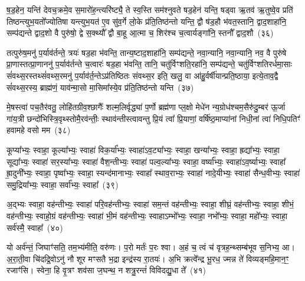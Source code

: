 ष॒ड॒हेन॒ यन्ति॑ देवच॒क्रमे॒व स॒मारो॑ह॒न्त्यरि॑ष्ट्यै॒ ते स्व॒स्ति सम॑श्नुवते षड॒हेन॑ यन्ति॒ षड्वा ऋ॒तव॑ ऋ॒तुष्वे॒व प्रति॑ तिष्ठन्त्युभ॒यतो᳚ज्योतिषा यन्त्युभ॒यत॑ ए॒व सु॑व॒र्गे लो॒के प्र॑ति॒तिष्ठ॑न्तो यन्ति॒ द्वौ ष॑ड॒हौ भ॑वत॒स्तानि॒ द्वाद॒शाहा॑नि॒ सम्प॑द्यन्ते द्वाद॒शो वै पुरु॑षो॒ द्वे स॒क्थ्यौ᳚ द्वौ बा॒हू आ॒त्मा च॒ शिर॑श्च च॒त्वार्यङ्गा॑नि॒ स्तनौ᳚ द्वाद॒शौ~(३६)

तत्पुरु॑ष॒मनु॑ प॒र्याव॑र्तन्ते॒ त्रयः॑ षड॒हा भ॑वन्ति॒ तान्य॒ष्टाद॒शाहा॑नि॒ सम्प॑द्यन्ते॒ नवा॒न्यानि॒ नवा॒न्यानि॒ नव॒ वै पुरु॑षे प्रा॒णास्तत्प्रा॒णाननु॑ प॒र्याव॑र्तन्ते च॒त्वारः॑ षड॒हा भ॑वन्ति॒ तानि॒ चतु॑र्विꣳशति॒रहा॑नि॒ सम्प॑द्यन्ते॒ चतु॑र्विꣳशतिरर्धमा॒साः सं॑वथ्स॒रस्तथ्सं॑वथ्स॒रमनु॑ प॒र्याव॑र्त॒न्ते\-ऽप्र॑तिष्ठितः संवथ्स॒र इति॒ खलु॒ वा आ॑हु॒र्वर्\mbox{}षी॑यान्प्रति॒ष्ठाया॒ इत्ये॒ताव॒द्वै सं॑वथ्स॒रस्य॒ ब्राह्म॑णं॒ याव॑न्मा॒सो मा॒सिमा᳚स्ये॒व प्र॑ति॒तिष्ठ॑न्तो यन्ति~(३७)

{\anuvakamend[{वि॒राज॑मे॒तेन॑ द्वाद॒शावे॒ताव॒द्वा अ॒ष्टौ च॑}]}%

मे॒षस्त्वा॑ पच॒तैर॑वतु॒ लोहि॑तग्रीव॒श्छागैः᳚ शल्म॒लिर्वृद्ध्या॑ प॒र्णो ब्रह्म॑णा प्ल॒क्षो मेधे॑न न्य॒ग्रोध॑श्चम॒सैरु॑दु॒म्बर॑ ऊ॒र्जा गा॑य॒त्री छन्दो॑भिस्त्रि॒वृथ्स्तोमै॒रव॑न्तीः॒ स्थाव॑न्तीस्त्वावन्तु प्रि॒यं त्वा᳚ प्रि॒याणां॒ वर्\mbox{}षि॑ष्ठ॒माप्या॑नां निधी॒नां त्वा॑ निधि॒पतिꣳ॑ हवामहे वसो मम~(३८)

{\anuvakamend[{मे॒षः षट्त्रिꣳ॑शत्}]}%

कूप्या᳚भ्यः॒ स्वाहा॒ कूल्या᳚भ्यः॒ स्वाहा॑ विक॒र्या᳚भ्यः॒ स्वाहा॑\-ऽव॒ट्या᳚भ्यः॒ स्वाहा॒ खन्या᳚भ्यः॒ स्वाहा॒ ह्रद्या᳚भ्यः॒ स्वाहा॒ सूद्या᳚भ्यः॒ स्वाहा॑ सर॒स्या᳚भ्यः॒ स्वाहा॑ वैश॒न्तीभ्यः॒ स्वाहा॑ पल्व॒ल्या᳚भ्यः॒ स्वाहा॒ वर्ष्या᳚भ्यः॒ स्वाहा॑\-ऽव॒र्ष्याभ्यः॒ स्वाहा᳚ ह्रा॒दुनी᳚भ्यः॒ स्वाहा॒ पृष्वा᳚भ्यः॒ स्वाहा॒ स्यन्द॑मानाभ्यः॒ स्वाहा᳚ स्थाव॒राभ्यः॒ स्वाहा॑ नादे॒यीभ्यः॒ स्वाहा॑ सैन्ध॒वीभ्यः॒ स्वाहा॑ समु॒द्रिया᳚भ्यः॒ स्वाहा॒ सर्वा᳚भ्यः॒ स्वाहा᳚~(३९)

{\anuvakamend[{कूप्या᳚भ्यश्चत्वारि॒ꣳ॒शत्}]}%

अ॒द्भ्यः स्वाहा॒ वह॑न्तीभ्यः॒ स्वाहा॑ परि॒वह॑न्तीभ्यः॒ स्वाहा॑ सम॒न्तं वह॑न्तीभ्यः॒ स्वाहा॒ शीघ्रं॒ वह॑न्तीभ्यः॒ स्वाहा॒ शीभं॒ वह॑न्तीभ्यः॒ स्वाहो॒ग्रं वह॑न्तीभ्यः॒ स्वाहा॑ भी॒मं वह॑न्तीभ्यः॒ स्वाहा\-ऽम्भो᳚भ्यः॒ स्वाहा॒ नभो᳚भ्यः॒ स्वाहा॒ महो᳚भ्यः॒ स्वाहा॒ सर्व॑स्मै॒ स्वाहा᳚~(४०)

{\anuvakamend[{अ॒द्भ्य एका॒न्नत्रि॒ꣳ॒शत्}]}%

यो अर्व॑न्तं॒ जिघाꣳ॑सति॒ तम॒भ्य॑मीति॒ वरु॑णः। प॒रो मर्तः॑ प॒रः श्वा। अ॒हं च॒ त्वं च॑ वृत्रह॒न्थ्सम्ब॑भूव स॒निभ्य॒ आ। अ॒रा॒ती॒वा चि॑दद्रि॒वो\-ऽनु॑ नौ शूर मꣳसतै भ॒द्रा इन्द्र॑स्य रा॒तयः॑। अ॒भि क्रत्वे᳚न्द्र भू॒रध॒ ज्मन्न ते॑ विव्यङ्महि॒मान॒ꣳ॒ रजाꣳ॑सि। स्वेना॒ हि वृ॒त्रꣳ शव॑सा ज॒घन्थ॒ न शत्रु॒रन्तं॑ विविदद्यु॒धा ते᳚~(४१)

